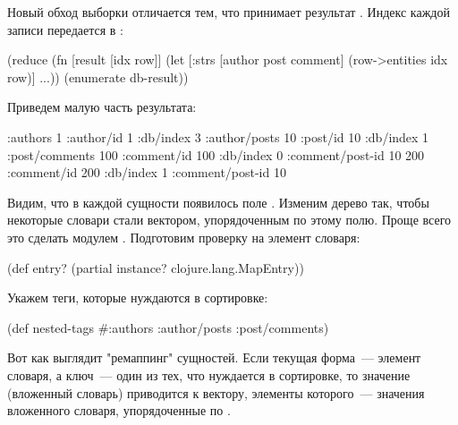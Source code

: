 Новый обход выборки отличается тем, что  принимает результат . Индекс каждой записи передается в :

\begin{english}
  \begin{clojure}
(reduce
 (fn [result [idx row]]
   (let [{:strs [author post comment]}
         (row->entities idx row)]
     ...))
 {}
 (enumerate db-result))
  \end{clojure}
\end{english}

Приведем малую часть результата:

\begin{english}
  \begin{clojure}
{:authors
 {1 {:author/id 1
     :db/index 3
     :author/posts
     {10 {:post/id 10
          :db/index 1
          :post/comments
          {100 {:comment/id 100
                :db/index 0
                :comment/post-id 10}
           200 {:comment/id 200
                :db/index 1
                :comment/post-id 10}}}}}}}
  \end{clojure}
\end{english}

Видим, что в каждой сущности появилось поле . Изменим дерево так, чтобы некоторые словари стали вектором, упорядоченным по этому полю. Проще всего это сделать модулем . Подготовим проверку на элемент словаря:

\begin{english}
  \begin{clojure}
(def entry?
  (partial instance? clojure.lang.MapEntry))
  \end{clojure}
\end{english}

Укажем теги, которые нуждаются в сортировке:

\begin{english}
  \begin{clojure}
(def nested-tags
  #{:authors :author/posts :post/comments})
  \end{clojure}
\end{english}

Вот как выглядит "ремаппинг" сущностей. Если текущая форма~--- элемент словаря, а ключ~--- один из тех, что нуждается в сортировке, то значение (вложенный словарь) приводится к вектору, элементы которого~--- значения вложенного словаря, упорядоченные по .

